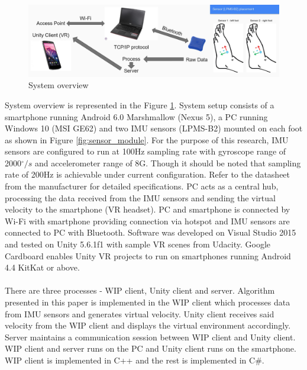 \begin{figure}[th]
\captionsetup{justification=raggedright,singlelinecheck=false}
\centering
\includegraphics[width=\textwidth,height=\textheight,keepaspectratio]{Figures/system_overview.jpg}
\decoRule
\caption[System overview]{System overview}
\label{fig:system_overview}
\end{figure}
\noindent
System overview is represented in the Figure \ref{fig:system_overview}. System setup consists of a smartphone running Android 6.0 Marshmallow (Nexus 5), a PC running Windows 10 (MSI GE62) and two IMU sensors (LPMS-B2) mounted on each foot as shown in Figure \ref{fig:sensor_module}. For the purpose of this research, IMU sensors are configured to run at 100Hz sampling rate with gyroscope range of 2000$^{\circ}/s$ and accelerometer range of 8G. Though it should be noted that sampling rate of 200Hz is achievable under current configuration. Refer to the datasheet from the manufacturer for detailed specifications. PC acts as a central hub, processing the data received from the IMU sensors and sending the virtual velocity to the smartphone (VR headset). PC and smartphone is connected by Wi-Fi with smartphone providing connection via hotspot and IMU sensors are connected to PC with Bluetooth. Software was developed on Visual Studio 2015 and tested on Unity 5.6.1f1 with sample VR scenes from Udacity. Google Cardboard enables Unity VR projects to run on smartphones running Android 4.4 KitKat or above.  
\\\\
There are three processes - WIP client, Unity client and server. Algorithm presented in this paper is implemented in the WIP client which processes data from IMU sensors and generates virtual velocity. Unity client receives said velocity from the WIP client and displays the virtual environment accordingly. Server maintains a communication session between WIP client and Unity client. WIP client and server runs on the PC and Unity client runs on the smartphone. WIP client is implemented in C++ and the rest is implemented in C\#.

